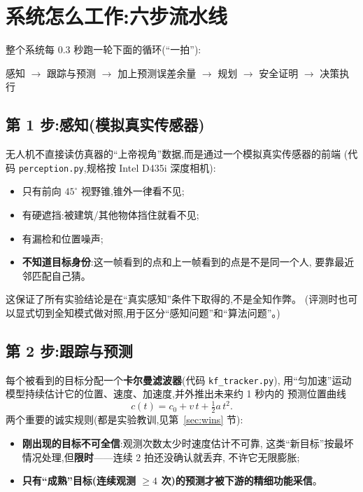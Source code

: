 \documentclass[11pt]{ctexart}
\newcommand{\code}[1]{\texttt{#1}}
\begin{document}
\section{系统怎么工作:六步流水线}\label{sec:pipeline}

整个系统每 0.3 秒跑一轮下面的循环(``一拍''):

\begin{center}
感知 $\to$ 跟踪与预测 $\to$ 加上预测误差余量 $\to$ 规划 $\to$ 安全证明 $\to$ 决策执行
\end{center}

\subsection{第 1 步:感知(模拟真实传感器)}

无人机不直接读仿真器的``上帝视角''数据,而是通过一个模拟真实传感器的前端
(代码 \code{perception.py},规格按 Intel D435i 深度相机):
\begin{itemize}
  \item 只有前向 $45^\circ$ 视野锥,锥外一律看不见;
  \item 有硬遮挡:被建筑/其他物体挡住就看不见;
  \item 有漏检和位置噪声;
  \item \textbf{不知道目标身份}:这一帧看到的点和上一帧看到的点是不是同一个人,
        要靠最近邻匹配自己猜。
\end{itemize}
这保证了所有实验结论是在``真实感知''条件下取得的,不是全知作弊。
(评测时也可以显式切到全知模式做对照,用于区分``感知问题''和``算法问题''。)

\subsection{第 2 步:跟踪与预测}

每个被看到的目标分配一个\textbf{卡尔曼滤波器}(代码 \code{kf\_tracker.py}),
用``匀加速''运动模型持续估计它的位置、速度、加速度,并外推出未来约 1 秒内的
预测位置曲线
\[
  c(t) = c_0 + v\,t + \tfrac{1}{2}a\,t^2 .
\]
两个重要的诚实规则(都是实验教训,见第~\ref{sec:wins} 节):
\begin{itemize}
  \item \textbf{刚出现的目标不可全信}:观测次数太少时速度估计不可靠,
        这类``新目标''按最坏情况处理,但\textbf{限时}——连续 2 拍还没确认就丢弃,
        不许它无限膨胀;
  \item \textbf{只有``成熟''目标(连续观测 $\ge 4$ 次)的预测才被下游的精细功能采信}。
\end{itemize}
\end{document}
